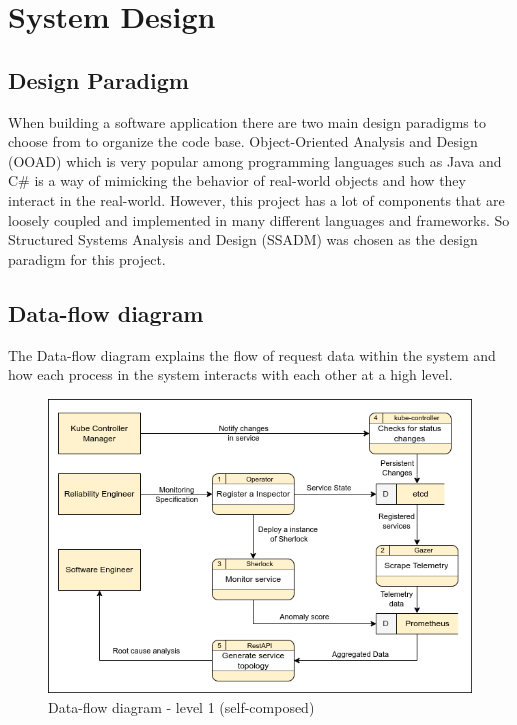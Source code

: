 \section{System Design}

\subsection{Design Paradigm}

When building a software application there are two main design paradigms to choose from to organize the code base. Object-Oriented Analysis and Design (OOAD) which is very popular among programming languages such as Java and C\# is a way of mimicking the behavior of real-world objects and how they interact in the real-world. However, this project has a lot of components that are loosely coupled and implemented in many different languages and frameworks. So Structured Systems Analysis and Design (SSADM) was chosen as the design paradigm for this project.

\subsection{Data-flow diagram}

The Data-flow diagram explains the flow of request data within the system and how each process in the system interacts with each other at a high level.

\begin{figure}[H]
    \includegraphics[width=12cm]{assets/system-design/data-flow-level-1.png}
    \caption{Data-flow diagram - level 1 (self-composed)}
\end{figure}

